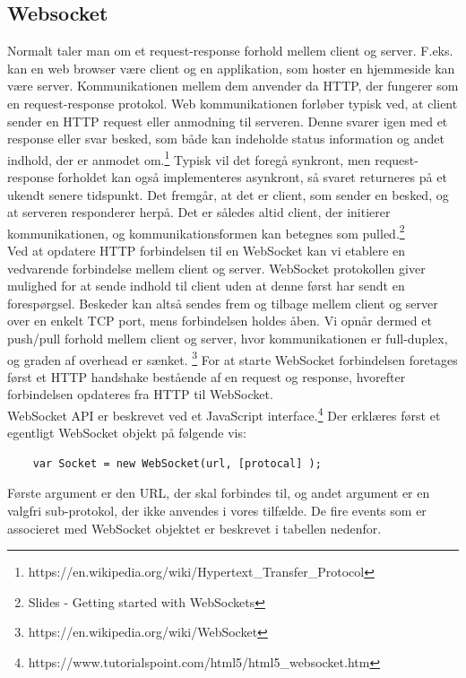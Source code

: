 \documentclass[Softwaredesign/Softwaredesign_main.tex]{subfiles}
\begin{document}
\subsection{Websocket}
Normalt taler man om et request-response forhold mellem client og server. F.eks. kan en web browser være client og en applikation, som hoster en hjemmeside kan være server. Kommunikationen mellem dem anvender da HTTP, der fungerer som en request-response protokol. Web kommunikationen forløber typisk ved, at client sender en HTTP request eller anmodning til serveren. Denne svarer igen med et response eller svar besked, som både kan indeholde status information og andet indhold, der er anmodet om.\footnote{https://en.wikipedia.org/wiki/Hypertext\_Transfer\_Protocol} Typisk vil det foregå synkront, men request-response forholdet kan også implementeres asynkront, så svaret returneres på et ukendt senere tidspunkt. Det fremgår, at det er client, som sender en besked, og at serveren responderer herpå. Det er således altid client, der initierer kommunikationen, og kommunikationsformen kan betegnes som pulled.\footnote{Slides - Getting started with WebSockets}
\\Ved at opdatere HTTP forbindelsen til en WebSocket kan vi etablere en vedvarende forbindelse mellem client og server. WebSocket protokollen giver mulighed for at sende indhold til client uden at denne først har sendt en forespørgsel. Beskeder kan altså sendes frem og tilbage mellem client og server over en enkelt TCP port, mens forbindelsen holdes åben. Vi opnår dermed et push/pull forhold mellem client og server, hvor kommunikationen er full-duplex, og graden af overhead er sænket. \footnote{https://en.wikipedia.org/wiki/WebSocket} For at starte WebSocket forbindelsen foretages først et HTTP handshake bestående af en request og response, hvorefter forbindelsen opdateres fra HTTP til WebSocket.
\\ WebSocket API er beskrevet ved et JavaScript interface.\footnote{https://www.tutorialspoint.com/html5/html5\_websocket.htm} Der erklæres først et egentligt WebSocket objekt på følgende vis:
\begin{lstlisting}
    var Socket = new WebSocket(url, [protocal] );
\end{lstlisting}
Første argument er den URL, der skal forbindes til, og andet argument er en valgfri sub-protokol, der ikke anvendes i vores tilfælde. De fire events som er associeret med WebSocket objektet er beskrevet i tabellen nedenfor.
\end{document}
